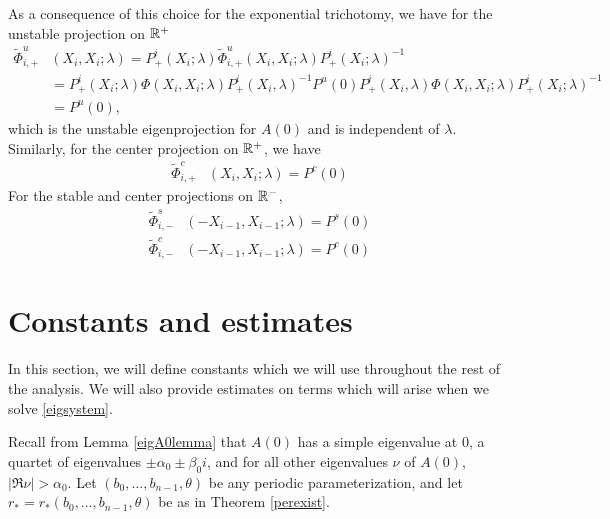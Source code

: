\documentclass[thesis.tex]{subfiles}
\begin{document}
As a consequence of this choice for the exponential trichotomy, we have for the unstable projection on $\mathbb{R}^+$
\begin{align*}
\tilde{\Phi}_{i,+}^{u}&(X_i, X_i ; \lambda) = P^i_+(X_i; \lambda) \tilde{\Phi}_{i,+}^{u}(X_i, X_i; \lambda) P^i_+(X_i; \lambda)^{-1} \\
&= P^i_+(X_i; \lambda) \Phi(X_i, X_i; \lambda) P^i_+(X_i, \lambda)^{-1}
P^u(0) P^i_+(X_i, \lambda) \Phi(X_i, X_i; \lambda) P^i_+(X_i; \lambda)^{-1} \\
&= P^u(0),
\end{align*}
which is the unstable eigenprojection for $A(0)$ and is independent of $\lambda$. Similarly, for the center projection on $\mathbb{R}^+$, we have
\begin{align*}
\tilde{\Phi}_{i,+}^{c}&(X_i, X_i ; \lambda) = P^c(0)
\end{align*}
For the stable and center projections on $\mathbb{R}^-$,
\begin{align*}
\tilde{\Phi}_{i,-}^{s}&(-X_{i-1}, X_{i-1} ; \lambda) = P^s(0) \\
\tilde{\Phi}_{i,-}^{c}&(-X_{i-1}, X_{i-1} ; \lambda) = P^c(0)
\end{align*}

\section{Constants and estimates}

In this section, we will define constants which we will use throughout the rest of the analysis. We will also provide estimates on terms which will arise when we solve \cref{eigsystem}.

Recall from Lemma \ref{eigA0lemma} that $A(0)$ has a simple eigenvalue at 0, a quartet of eigenvalues $\pm \alpha_0 \pm \beta_0 i$, and for all other eigenvalues $\nu$ of $A(0)$, $|\Re \nu| > \alpha_0$. Let $(b_0, \dots, b_{n-1}, \theta)$ be any periodic parameterization, and let $r_* = r_*(b_0, \dots, b_{n-1}, \theta)$ be as in Theorem \ref{perexist}. 
\end{document}
